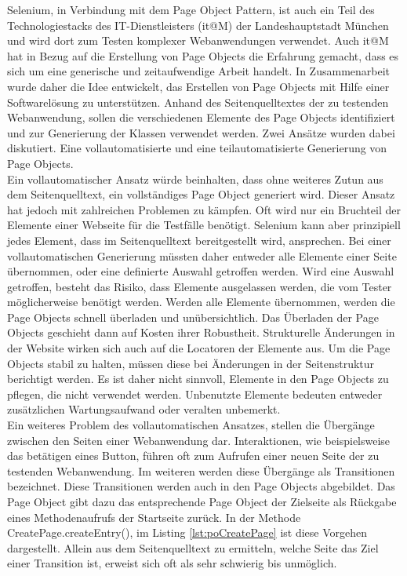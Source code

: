 Selenium, in Verbindung mit dem Page Object Pattern, ist auch ein Teil des Technologiestacks des IT-Dienstleisters (it@M) der Landeshauptstadt München und wird dort zum Testen komplexer Webanwendungen verwendet. Auch it@M hat in Bezug auf die Erstellung von Page Objects die Erfahrung gemacht, dass es sich um eine generische und zeitaufwendige Arbeit handelt.
In Zusammenarbeit wurde daher die Idee entwickelt, das Erstellen von Page Objects mit Hilfe einer Softwarelösung zu unterstützen.
Anhand des Seitenquelltextes der zu testenden Webanwendung, sollen die verschiedenen Elemente des Page Objects identifiziert und zur Generierung der Klassen verwendet werden.
Zwei Ansätze wurden dabei diskutiert. Eine vollautomatisierte und eine teilautomatisierte Generierung von Page Objects.\\
Ein vollautomatischer Ansatz würde beinhalten, dass ohne weiteres Zutun aus dem Seitenquelltext, ein vollständiges Page Object generiert wird. Dieser Ansatz hat jedoch mit zahlreichen Problemen zu kämpfen. Oft wird nur ein Bruchteil der Elemente einer Webseite für die Testfälle benötigt. Selenium kann aber prinzipiell jedes Element, dass im Seitenquelltext bereitgestellt wird, ansprechen. Bei einer vollautomatischen Generierung müssten daher entweder alle Elemente einer Seite übernommen, oder eine definierte Auswahl getroffen werden.
Wird eine Auswahl getroffen, besteht das Risiko, dass Elemente ausgelassen werden, die vom Tester möglicherweise benötigt werden. Werden alle Elemente übernommen, werden die Page Objects schnell überladen und unübersichtlich. Das Überladen der Page Objects geschieht dann auf Kosten ihrer Robustheit. Strukturelle Änderungen in der Website wirken sich auch auf die Locatoren der Elemente aus. Um die Page Objects stabil zu halten, müssen diese bei Änderungen in der Seitenstruktur berichtigt werden.
Es ist daher nicht sinnvoll, Elemente in den Page Objects zu pflegen, die nicht verwendet werden. Unbenutzte Elemente bedeuten entweder zusätzlichen Wartungsaufwand oder veralten unbemerkt.\\
Ein weiteres Problem des vollautomatischen Ansatzes, stellen die Übergänge zwischen den Seiten einer Webanwendung dar. Interaktionen, wie beispielsweise das betätigen eines Button, führen oft zum Aufrufen einer neuen Seite der zu testenden Webanwendung. Im weiteren werden diese Übergänge als Transitionen bezeichnet. Diese Transitionen werden auch in den Page Objects abgebildet. Das Page Object gibt dazu das entsprechende Page Object der Zielseite als Rückgabe eines Methodenaufrufs der Startseite zurück. In der Methode \grq CreatePage.createEntry()\grq, im Listing \ref{lst:poCreatePage} ist diese Vorgehen dargestellt. Allein aus dem Seitenquelltext zu ermitteln, welche Seite das Ziel einer Transition ist, erweist sich oft als sehr schwierig bis unmöglich.\\
